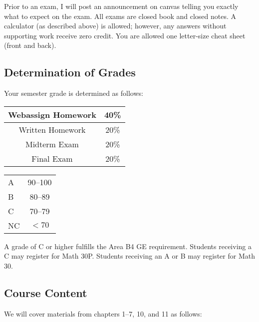 \documentclass[letterpaper,12pt,fleqn]{article}
\begin{document}
\bigskip

Prior to an exam, I will post an announcement on canvas telling you exactly what to expect on the exam.  All exams are closed
book and closed notes.  A calculator (as described above) is allowed; however, any answers without supporting work receive
zero credit.  You are allowed one letter-size cheat sheet (front and back).

\subsection*{Determination of Grades}

Your semester grade is determined as follows:

\bigskip

\begin{minipage}{3in}
  \begin{tabular}{|c|c|}
    \hline
    Webassign Homework & 40\% \\
    \hline
    Written Homework & 20\% \\
    \hline
    Midterm Exam & 20\% \\
    \hline
    Final Exam & 20\% \\
    \hline
  \end{tabular}
\end{minipage}
\begin{minipage}{3in}
  \begin{tabular}{|l|c|}
    \hline
    A & 90--100 \\
    B & 80--89 \\
    C & 70--79 \\
    NC & \(<70\) \\
    \hline
  \end{tabular}
\end{minipage}

A grade of C or higher fulfills the Area B4 GE requirement.  Students receiving a C may register for Math 30P.  Students
receiving an A or B may register for Math 30.

\subsection*{Course Content}

We will cover materials from chapters 1--7, 10, and 11 as follows:
\end{document}

